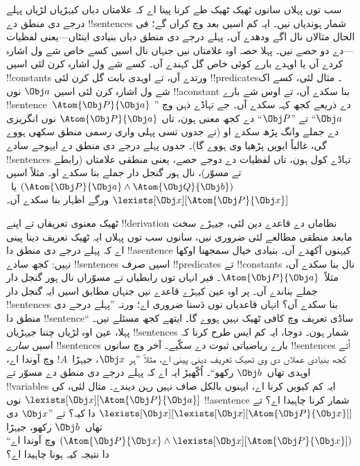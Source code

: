 \documentclass[../../../include/open-logic-section]{subfiles}
\begin{document}


سب توں پہلاں سانوں ٹھیک ٹھیک طے کرنا پینا اے کہ علامتاں دیاں
کیہڑیاں لڑیاں پہلے درجے دی منطق دے !!{sentence}s شمار ہوندیاں
نیں۔ ایہ کم اسیں بعد وچ کراں گے؛ فی الحال مثالاں نال اگے
ودھدے آں۔ پہلے درجے دی منطق دیاں بنیادی اینٹاں---یعنی
لفظیات---دے دو حصے نیں۔ پہلا حصہ اوہ علامتاں نیں جنہاں
نال اسیں کسے خاص شے ول اشارہ کردے آں یا اوہدے بارے کوئی
خاص گل کہندے آں۔ کسے شے ول اشارہ کرن لئی اسیں
!!{constant}s ورتدے آں، تے اوہدی بابت گل کرن لئی
!!{predicate}s۔ مثال لئی، کسے اک شے ول اشارہ کرن
لئی اسیں $\Obj a$ نوں !!a{constant} بنا سکدے آں،
تے اوس شے بارے !!{sentence}~$\Atom{\Obj P}{\Obj
a}$ دے ذریعے کجھ کہہ سکدے آں۔ جے تہاڈے ذہن وچ
”$\Obj a$“ تے ”$\Obj P$“ دے کجھ معنی ہون،
تاں $\Atom{\Obj P}{\Obj a}$ نوں انگریزی دے جملے
وانگ پڑھ سکدے او (تے جدوں تسی پہلی واری رسمی منطق
سکھی ہووے گی، غالباً ایویں پڑھیا وی ہووے گا)۔
جدوں پہلے درجے دی منطق دے ایہوجے سادے !!{sentence}s
تہاڈے کول ہون، تاں لفظیات دے دوجے حصے، یعنی منطقی
علامتاں (رابطے تے مسوّر)، نال ہور گنجل دار جملے
بنا سکدے او۔ مثلاً اسیں
$(\Atom{\Obj P}{\Obj a} \land \Atom{\Obj Q}{\Obj b})$
یا~$\lexists[\Obj x][\Atom{\Obj P}{\Obj x}]$
ورگے اظہار بنا سکدے آں۔

ٹھیک معنوی تعریفاں تے اپنے !!{derivation} نظاماں
دے قاعدے دین لئی، جیہڑے سخت مابعد منطقی مطالعے
لئی ضروری نیں، سانوں سب توں پہلاں ایہ ٹھیک
تعریف دینا پینی اے کہ پہلے درجے دی منطق دا
!!a{sentence} کیہنوں آکھدے آں۔ بنیادی خیال سمجھنا
اوکھا نہیں: کجھ سادے !!{sentence}s اسیں صرف
!!{predicate}s تے !!{constant}s نال بنا سکدے آں،
مثلاً~$\Atom{\Obj P}{\Obj a}$۔ فیر انہاں توں
رابطیاں تے مسوّراں نال ہور گنجل دار جملے
بناندے آں۔ پر اوہ عین کیہڑے قاعدے نیں جنہاں
مطابق اسیں ایہ گنجل دار !!{sentence}s بنا سکدے
آں؟ انہاں قاعدیاں نوں دَسنا ضروری اے؛ ورنہ
”پہلے درجے دی منطق دا !!{sentence}“ ساڈی تعریف
وچ کافی ٹھیک نہیں ہووے گا۔ ایتھے کجھ مسئلے
نیں۔ پہلا، عین اوہ لڑیاں چننا جیہڑیاں
!!{sentence}s شمار ہون۔ دوجا، ایہ کم ایس طرح
کرنا کہ اسیں \emph{سارے} !!{sentence}s بارے
ریاضیاتی ثبوت دے سکّیے۔ آخر وچ سانوں
!!{sentence}s اُتے کجھ بنیادی عملاں دی وی ٹھیک
تعریف دینی پینی اے، مثلاً ”ہر $\Obj x$،
جیہڑا~$!A$ وچ آوندا اے، اوہدی تھاں~$\Obj b$
رکھو“۔
اُکّھیڑ ایہ اے کہ پہلے درجے دی منطق دے
مسوّر تے !!{variable}s ایہ کم کیویں کرنا اے،
ایہنوں بالکل صاف نہیں رہن دیندے۔ مثال لئی،
کی $\lexists[\Obj x][\Atom{\Obj P}{\Obj a}]$
نوں !!a{sentence} شمار کرنا چاہیدا اے؟
تے $\lexists[\Obj x][\lexists[\Obj x][\Atom{\Obj P}{\Obj x}]]$
دا کیہ؟ تے ”$\Obj x$ دی تھاں~$\Obj b$ رکھو،
جیہڑا $(\Atom{\Obj P}{\Obj x} \land \lexists[\Obj x][\Atom{\Obj P}{\Obj x}])$
وچ آوندا اے“ دا نتیجہ کیہ ہونا چاہیدا اے؟
\end{document}
